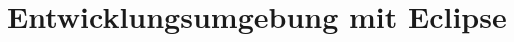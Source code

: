 \section{Entwicklungsumgebung mit Eclipse} \label{sec:impl-Entwicklungsumgebung}



















\label{sec:impl-Entwicklungsumgebung-ende}